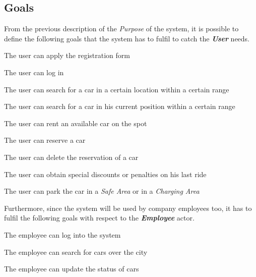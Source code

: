 \documentclass[11pt,a4paper]{report}
\begin{document}
\subsection{Goals}
From the previous description of the \textit{Purpose} of the system, it is possible to define the following goals that the system has to fulfil to catch the \textit{\textbf{User}} needs.
\begin{Goal}
\item {} {The user can apply the registration form}
\item {} {The user can log in}
\item {} {The user can search for a car in a certain location within a certain range}
\item {} {The user can search for a car in his current position within a certain range}
\item {} {The user can rent an available car on the spot}
\item {} {The user can reserve a car}
\item {} {The user can delete the reservation of a car}
\item {} {The user can obtain special discounts or penalties on his last ride}
\item {} {The user can park the car in a \textit{Safe Area} or in a \textit{Charging Area}}
\end{Goal}
Furthermore, since the system will be used by company employees too, it has to fulfil the following goals with respect to the \textbf{\textit{Employee}} actor. 
\begin{Goal}[resume]
\item {} {The employee can log into the system}
\item {} {The employee can search for cars over the city}
\item {} {The employee can update the status of cars}
\end{Goal}
\end{document}
